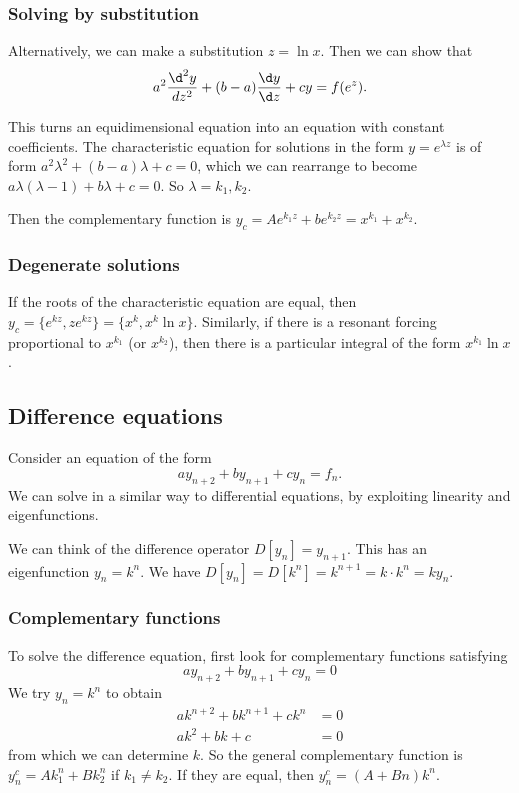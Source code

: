 \documentclass[a4paper]{article}
\begin{document}
  \subsubsection{Solving by substitution}
  Alternatively, we can make a substitution $z = \ln x$. Then we can show that 
  \[
    a^2\frac{\d ^2 y}{d z^2} + (b - a)\frac{\d y}{\d z} + cy = f(e^z).
  \]

  This turns an equidimensional equation into an equation with constant coefficients. The characteristic equation for solutions in the form $y = e^{\lambda z}$ is of form $a^2\lambda^2 + (b - a)\lambda + c = 0$, which we can rearrange to become $a\lambda(\lambda - 1) + b\lambda + c = 0$. So $\lambda = k_1, k_2$.

  Then the complementary function is $y_c = Ae^{k_1z} + be^{k_2z} = x^{k_1} + x^{k_2}$.

  \subsubsection{Degenerate solutions}
  If the roots of the characteristic equation are equal, then $y_c = \{e^{kz}, ze^{kz}\} = \{x^k, x^k\ln x\}$. Similarly, if there is a resonant forcing proportional to $x^{k_1}$ (or $x^{k_2}$), then there is a particular integral of the form $x^{k_1}\ln x$.

  \subsection{Difference equations}
  Consider an equation of the form
  \[
    a y_{n + 2} + by_{n + 1} + cy_n = f_n.
  \]
  We can solve in a similar way to differential equations, by exploiting linearity and eigenfunctions.

  We can think of the difference operator $D[y_n] = y_{n + 1}$. This has an eigenfunction $y_n = k^n$. We have $D[y_n] = D[k^n] = k^{n + 1} = k\cdot k^n = ky_n$.

  \subsubsection{Complementary functions}
  To solve the difference equation, first look for complementary functions satisfying
  \[
    ay_{n + 2} + by_{n + 1} + cy_n = 0
  \]
  We try $y_n = k^n$ to obtain
  \begin{align*}
    ak^{n + 2} + bk^{n + 1} + ck^n &= 0\\
    ak^2 + bk + c &= 0
  \end{align*}
  from which we can determine $k$. So the general complementary function is $y_n^c = Ak_1^n + Bk_2^n$ if $k_1 \not= k_2$. If they are equal, then $y_n^c = (A + Bn)k^n$.
\end{document}
